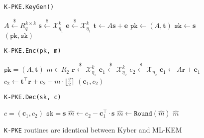 \documentclass[journal=tches,submission]{iacrtrans}
\newcommand{\pk}{\texttt{pk}}
\newcommand{\sk}{\texttt{sk}}
\newcommand{\leftsample}{\stackrel{\$}{\leftarrow}}
\begin{document}
\begin{figure}[H]
    \centering

    \begin{minipage}[t]{0.33\textwidth}
        \begin{algorithm}[H]
            \caption*{\texttt{K-PKE.KeyGen()}}
            \begin{algorithmic}[1]
                \State $A \leftsample R_q^{k \times k}$
                \State $\mathbf{s} \leftsample \mathcal{X}_{\eta_1}^k$
                \State $\mathbf{e} \leftsample \mathcal{X}_{\eta_1}^k$
                \State $\mathbf{t} \leftarrow A\mathbf{s} + \mathbf{e}$
                \State $\pk \leftarrow (A, \mathbf{t})$
                \State $\sk \leftarrow \mathbf{s}$
                \State \Return $(\pk, \sk)$
            \end{algorithmic}
        \end{algorithm}
    \end{minipage}\hfill
    \begin{minipage}[t]{0.33\textwidth}
        \begin{algorithm}[H]
            \caption*{\texttt{K-PKE.Enc(pk, m)}}
            \begin{algorithmic}[1]
                \Ensure $\pk = (A, \mathbf{t})$
                \Ensure $m \in R_2$
                \State $\mathbf{r} \leftsample \mathcal{X}_{\eta_1}^k$
                \State $\mathbf{e}_1 \leftsample \mathcal{X}_{\eta_2}^k$
                \State $e_2 \leftsample \mathcal{X}_{\eta_2}$
                \State $\mathbf{c}_1 \leftarrow A\mathbf{r} + \mathbf{e}_1$
                \State $c_2 \leftarrow \mathbf{t}^\intercal \mathbf{r} + e_2 + m \cdot \lfloor \frac{q}{2}\rceil$
                \State \Return $(\mathbf{c}_1, c_2)$
            \end{algorithmic}
        \end{algorithm}
    \end{minipage}\hfill
    \begin{minipage}[t]{0.3\textwidth}
        \begin{algorithm}[H]
            \caption*{\texttt{K-PKE.Dec(sk, c)}}
            \begin{algorithmic}[1]
                \Ensure $c = (\mathbf{c}_1, c_2)$
                \Ensure $\sk = \mathbf{s}$
                \State $\hat{m} \leftarrow c_2 - \mathbf{c}_1^\intercal \cdot \mathbf{s}$
                \State $\hat{m} \leftarrow \texttt{Round}(\hat{m})$
                \State \Return $\hat{m}$
            \end{algorithmic}
        \end{algorithm}
    \end{minipage}
    \caption{\texttt{K-PKE} routines are identical between Kyber and ML-KEM}\label{fig:k-pke-routines}
\end{figure}
\end{document}
